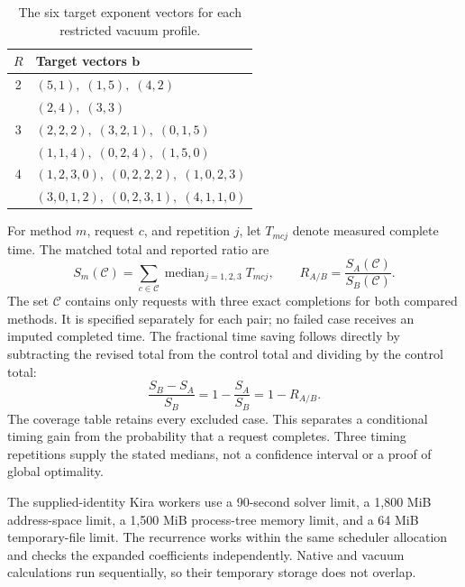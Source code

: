 \begin{table}[!htbp]\centering\small
\caption{The six target exponent vectors for each restricted vacuum profile.}\label{tab:coverage-targets}
\begin{tabular}{@{}cl@{}}\toprule
$R$ & Target vectors $\boldsymbol b$\\\midrule
2 & $(5,1),\;(1,5),\;(4,2)$\\
 & $(2,4),\;(3,3)$\\
3 & $(2,2,2),\;(3,2,1),\;(0,1,5)$\\
 & $(1,1,4),\;(0,2,4),\;(1,5,0)$\\
4 & $(1,2,3,0),\;(0,2,2,2),\;(1,0,2,3)$\\
 & $(3,0,1,2),\;(0,2,3,1),\;(4,1,1,0)$\\
\bottomrule\end{tabular}
\end{table}

For method $m$, request $c$, and repetition $j$, let $T_{mcj}$ denote measured complete time. The matched total and reported ratio are
\begin{equation}
S_m(\mathcal C)=\sum_{c\in\mathcal C}\operatorname{median}_{j=1,2,3}T_{mcj},
\qquad R_{A/B}=\frac{S_A(\mathcal C)}{S_B(\mathcal C)}.
\end{equation}
The set $\mathcal C$ contains only requests with three exact completions for both compared methods. It is specified separately for each pair; no failed case receives an imputed completed time. The fractional time saving follows directly by subtracting the revised total from the control total and dividing by the control total:
\begin{equation}
\frac{S_B-S_A}{S_B}=1-\frac{S_A}{S_B}=1-R_{A/B}.
\end{equation}
The coverage table retains every excluded case. This separates a conditional timing gain from the probability that a request completes. Three timing repetitions supply the stated medians, not a confidence interval or a proof of global optimality.

The supplied-identity Kira workers use a 90-second solver limit, a 1,800 MiB address-space limit, a 1,500 MiB process-tree memory limit, and a 64 MiB temporary-file limit. The recurrence works within the same scheduler allocation and checks the expanded coefficients independently. Native and vacuum calculations run sequentially, so their temporary storage does not overlap.
